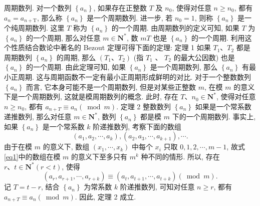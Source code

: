
周期数列.
对一个数列 $\left\{a_n\right\}$, 如果存在正整数 $T$ 及 $n_0$, 使得对任意 $n \geqslant n_0$, 都有 $a_n= a_{n+\mathrm{T}}$, 那么称 $\left\{a_n\right\}$ 是一个周期数列.
进一步, 若 $n_0=1$, 则称 $\left\{a_n\right\}$ 是一个纯周期数列.
这里 $T$ 称为 $\left\{a_n\right\}$ 的一个周期.
由周期数列的定义可知, 如果 $T$ 为 $\left\{a_n\right\}$ 的一个周期, 那么对任意 $m \in \mathbf{N}^*$, 数 $m T$ 也是 $\left\{a_n\right\}$ 的一个周期.
利用这个性质结合数论中著名的 Bezout 定理可得下面的定理:
定理 1 如果 $T_1 、 T_2$ 都是周期数列 $\left\{a_n\right\}$ 的周期, 那么 $\left(T_1 、 T_2\right)$ (指 $T_1$ 、 $T_2$ 的最大公因数) 也是 $\left\{a_n\right\}$ 的一个周期.
由此定理可知, 如果 $\left\{a_n\right\}$ 是一个周期数列, 那么 $\left\{a_n\right\}$ 有最小正周期.
这与周期函数不一定有最小正周期形成鲜明的对比.
对于一个整数数列 $\left\{a_n\right\}$ 而言, 它本身可能不是一个周期数列, 但是对某些正整数 $m$, 在模 $m$ 的意义下是一个周期数列, 这就是模周期数列的概念.
此时, 存在 $T 、 n_0 \in \mathbf{N}^*$, 使得对任意 $n \geqslant n_0$, 都有 $a_{n+T} \equiv a_n(\bmod m)$.
定理 2 整数数列 $\left\{a_n\right\}$ 如果是一个常系数递推数列, 那么对任意 $m \in \mathbf{N}^*$, 数列 $\left\{a_n\right\}$ 都是模 $m$ 下的一个周期数列.
事实上,如果 $\left\{a_n\right\}$ 是一个常系数 $k$ 阶递推数列, 考察下面的数组
$$
\left(a_1, a_2, \cdots, a_k\right),\left(a_2, a_3, \cdots, a_{k+1}\right), \cdots . \label{eq1}
$$
由于在模 $m$ 的意义下, 数组 $\left(x_1, \cdots, x_k\right)$ 中每个 $x_i$ 只取 $0,1,2, \cdots, m-1$, 故式\ref{eq1}中的数组在模 $m$ 的意义下至多只有 $m^k$ 种不同的情形.
所以, 存在 $r 、 t \in \mathbf{N}^*(r<t)$, 使得
$$
\left(a_r, a_{r+1}, \cdots, a_{r+k}\right) \equiv\left(a_t, a_{t+1}, \cdots, a_{t+k}\right)(\bmod m) .
$$
记 $T=t-r$, 结合 $\left\{a_n\right\}$ 为常系数 $k$ 阶递推数列, 可知对任意 $n \geqslant r$, 都有 $a_{n+T} \equiv a_n(\bmod m)$.
因此, 定理 2 成立.



